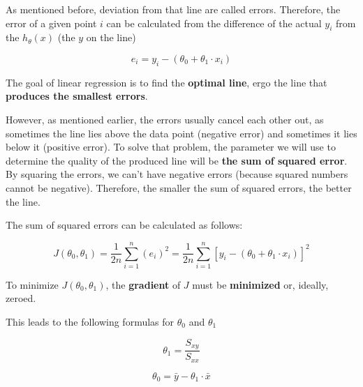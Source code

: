 \documentclass[a4paper, 11pt]{article}
\begin{document}
\vspace{10px}

As mentioned before, deviation from that line are called errors. Therefore, the error of a given point $i$ can be calculated from the difference of the actual $y_{i}$ from the $h_{\theta}(x)$ (the $y$ on the line)

\begin{equation}
	e_{i} = y_{i} - (\theta^{}_{0} + \theta^{}_{1} \cdot x_{i})
\end{equation}

\vspace{10px}

The goal of linear regression is to find the \textbf{optimal line}, ergo the line that \textbf{produces the smallest errors}.

However, as mentioned earlier, the errors usually cancel each other out, as sometimes the line lies above the data point (negative error) and sometimes it lies below it (positive error). To solve that problem, the parameter we will use to determine the quality of the produced line will be \textbf{the sum of squared error}. By squaring the errors, we can't have negative errors (because squared numbers cannot be negative). Therefore, the smaller the sum of squared errors, the better the line.

The sum of squared errors can be calculated as follows:

\begin{equation}
	 J(\theta^{}_{0}, \theta^{}_{1}) = \frac{1}{2n} \sum^{n}_{i=1}(e_{i})^2 = \frac{1}{2n} \sum^{n}_{i=1}[y_{i} - (\theta^{}_{0} + \theta^{}_{1} \cdot x_{i})]^2
\end{equation}

\vspace{10px}

To minimize $J(\theta^{}_{0}, \theta^{}_{1})$, the \textbf{gradient} of $J$ must be \textbf{minimized} or, ideally, zeroed. 

This leads to the following formulas for $\theta^{}_{0}$ and $\theta^{}_{1}$

\begin{minipage}{0.45\textwidth}
    \begin{equation}
    	\theta^{}_{1} = \frac{S_{xy}}{S_{xx}}
\end{equation}
\end{minipage} \hfill
\begin{minipage}{0.45\textwidth}
    \begin{equation}
    	\theta^{}_{0} = \bar y - \theta^{}_{1} \cdot \bar x
\end{equation}
\end{minipage}
\end{document}
